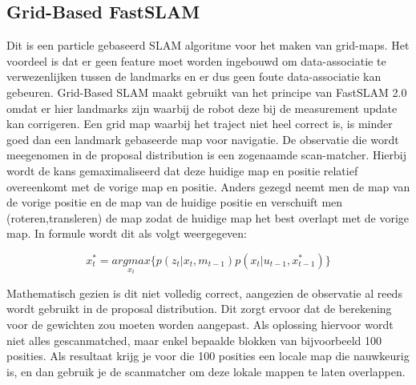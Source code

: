 \documentclass{book}
\begin{document}
\subsection{Grid-Based FastSLAM}
Dit is een particle gebaseerd SLAM algoritme voor het maken van grid-maps. Het voordeel is dat er geen feature moet worden ingebouwd om data-associatie te verwezenlijken tussen de landmarks en er dus geen foute data-associatie kan gebeuren. 
Grid-Based SLAM maakt gebruikt van het principe van FastSLAM 2.0 omdat er hier landmarks zijn waarbij de robot deze bij de measurement update kan corrigeren. Een grid map waarbij het traject niet heel correct is, is minder goed dan een landmark gebaseerde map voor navigatie.
De observatie die wordt meegenomen in de proposal distribution is een zogenaamde scan-matcher. Hierbij wordt de kans gemaximaliseerd dat deze huidige map en positie relatief overeenkomt met de vorige map en positie. Anders gezegd neemt men de map van de vorige positie en de map van de huidige positie en verschuift men (roteren,transleren) de map zodat de huidige map het best overlapt met de vorige map. In formule wordt dit als volgt weergegeven:

\begin{equation}
x_{t}^{*}=\underset{x_{t}}{argmax}\{p(z_{t}|x_{t},m_{t-1})p(x_{t}|u_{t-1},x_{t-1}^{*}) \}
\end{equation}

Mathematisch gezien is dit niet volledig correct, aangezien de observatie al reeds wordt gebruikt in de proposal distribution. Dit zorgt ervoor dat de berekening voor de gewichten zou moeten worden aangepast.
Als oplossing hiervoor wordt niet alles gescanmatched, maar enkel bepaalde blokken van bijvoorbeeld 100 posities. Als resultaat krijg je voor die 100 posities een locale map die nauwkeurig is, en dan gebruik je de scanmatcher om deze lokale mappen te laten overlappen.
\end{document}
